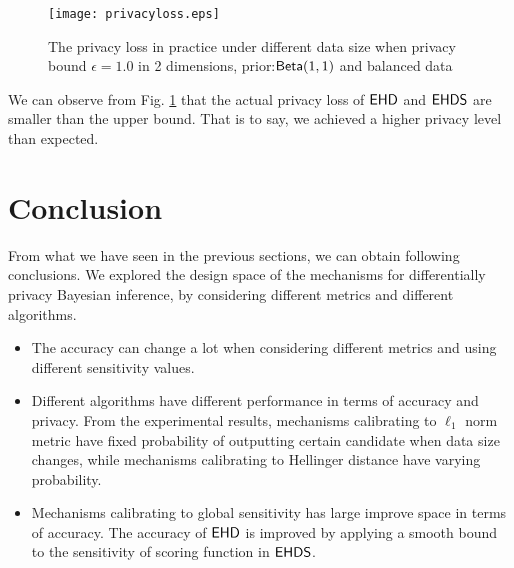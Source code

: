 \documentclass{article}
\begin{document}
\begin{figure}
\begin{center}
\centering
    \texttt{[image: privacyloss.eps]}
\caption{The privacy loss in practice under different data size when privacy bound $\epsilon = 1.0$ in 2 dimensions, prior:$\mathsf{Beta}(1,1)$ and balanced data}
\label{fig_privacy}
\end{center}
\end{figure}

We can observe from Fig. \ref{fig_privacy} that the actual privacy loss of $\mathsf{EHD}$ and $\mathsf{EHDS}$ are smaller than the upper bound. That is to say, we achieved a higher privacy level than expected. 


\section{Conclusion}
From what we have seen in the previous sections, we can obtain following conclusions. We explored the design space of the mechanisms for differentially privacy Bayesian inference, by considering different metrics and different algorithms.
\begin{itemize}
  \item The accuracy can change a lot when considering different metrics and using different sensitivity values.
 
  \item Different algorithms have different performance in terms of accuracy and privacy. From the experimental results, mechanisms calibrating to $\ell_1$ norm metric have fixed probability of outputting certain candidate when data size changes, while mechanisms calibrating to Hellinger distance have varying probability. 

  \item Mechanisms calibrating to global sensitivity has large improve space in terms of accuracy. The accuracy of $\mathsf{EHD}$ is improved by applying a smooth bound to the sensitivity of scoring function in $\mathsf{EHDS}$.
\end{itemize}







\end{document}
